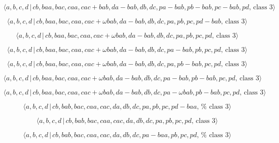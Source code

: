 \documentclass[10pt]{article}
\begin{document}
\begin{equation}
\langle
a,b,c,d\,|\,cb,baa,bac,caa,cac+bab,da-bab,db,dc,pa-bab,pb-bab,pc-bab,pd,\,%
\text{class }3\rangle  \tag{7.3797}
\end{equation}

\begin{equation}
\langle a,b,c,d\,|\,cb,baa,bac,caa,cac+\omega
bab,da-bab,db,dc,pa,pb,pc,pd-bab,\,\text{class }3\rangle  \tag{7.3798}
\end{equation}

\begin{equation}
\langle a,b,c,d\,|\,cb,baa,bac,caa,cac+\omega bab,da-bab,db,dc,pa,pb,pc,pd,\,%
\text{class }3\rangle  \tag{7.3799}
\end{equation}

\begin{equation}
\langle a,b,c,d\,|\,cb,baa,bac,caa,cac+\omega
bab,da-bab,db,dc,pa-bab,pb,pc,pd,\,\text{class }3\rangle  \tag{7.3800}
\end{equation}

\begin{equation}
\langle a,b,c,d\,|\,cb,baa,bac,caa,cac+\omega
bab,da-bab,db,dc,pa,pb-bab,pc,pd,\,\text{class }3\rangle  \tag{7.3801}
\end{equation}

\begin{equation}
\langle a,b,c,d\,|\,cb,baa,bac,caa,cac+\omega
bab,da-bab,db,dc,pa-bab,pb-bab,pc,pd,\,\text{class }3\rangle  \tag{7.3802}
\end{equation}

\begin{equation}
\langle a,b,c,d\,|\,cb,baa,bac,caa,cac+\omega bab,da-bab,db,dc,pa-\omega
bab,pb-bab,pc,pd,\,\text{class }3\rangle  \tag{7.3803}
\end{equation}

\begin{equation}
\langle a,b,c,d\,|\,cb,bab,bac,caa,cac,da,db,dc,pa,pb,pc,pd-baa,\,\text{%
class }3\rangle  \tag{7.3804}
\end{equation}

\begin{equation}
\langle a,b,c,d\,|\,cb,bab,bac,caa,cac,da,db,dc,pa,pb,pc,pd,\,\text{class }%
3\rangle  \tag{7.3805}
\end{equation}

\begin{equation}
\langle a,b,c,d\,|\,cb,bab,bac,caa,cac,da,db,dc,pa-baa,pb,pc,pd,\,\text{%
class }3\rangle  \tag{7.3806}
\end{equation}
\end{document}
